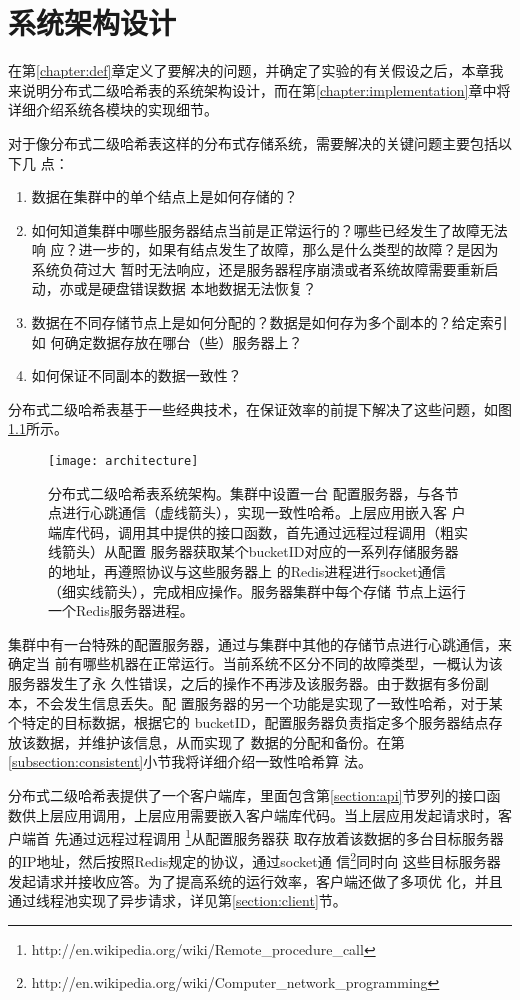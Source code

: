 \chapter{系统架构设计}\label{chapter:architecture}
在第\ref{chapter:def}章定义了要解决的问题，并确定了实验的有关假设之后，本章我
来说明分布式二级哈希表的系统架构设计，而在第\ref{chapter:implementation}章中将
详细介绍系统各模块的实现细节。

对于像分布式二级哈希表这样的分布式存储系统，需要解决的关键问题主要包括以下几
点：
\begin{enumerate}
  \item 数据在集群中的单个结点上是如何存储的？
  \item 如何知道集群中哪些服务器结点当前是正常运行的？哪些已经发生了故障无法响
  应？进一步的，如果有结点发生了故障，那么是什么类型的故障？是因为系统负荷过大
  暂时无法响应，还是服务器程序崩溃或者系统故障需要重新启动，亦或是硬盘错误数据
  本地数据无法恢复？
  \item 数据在不同存储节点上是如何分配的？数据是如何存为多个副本的？给定索引如
  何确定数据存放在哪台（些）服务器上？
  \item 如何保证不同副本的数据一致性？
\end{enumerate}
分布式二级哈希表基于一些经典技术，在保证效率的前提下解决了这些问题，如图
\ref{figure:architecture}所示。
\begin{figure}[htb]
  \centering
  \texttt{[image: architecture]}
  \caption[分布式二级哈希表系统架构]{分布式二级哈希表系统架构。集群中设置一台
  配置服务器，与各节点进行心跳通信（虚线箭头），实现一致性哈希。上层应用嵌入客
  户端库代码，调用其中提供的接口函数，首先通过远程过程调用（粗实线箭头）从配置
  服务器获取某个bucketID对应的一系列存储服务器的地址，再遵照协议与这些服务器上
  的Redis进程进行socket通信（细实线箭头），完成相应操作。服务器集群中每个存储
  节点上运行一个Redis服务器进程。}
  \label{figure:architecture}
\end{figure}

集群中有一台特殊的配置服务器，通过与集群中其他的存储节点进行心跳通信，来确定当
前有哪些机器在正常运行。当前系统不区分不同的故障类型，一概认为该服务器发生了永
久性错误，之后的操作不再涉及该服务器。由于数据有多份副本，不会发生信息丢失。配
置服务器的另一个功能是实现了一致性哈希，对于某个特定的目标数据，根据它的
bucketID，配置服务器负责指定多个服务器结点存放该数据，并维护该信息，从而实现了
数据的分配和备份。在第\ref{subsection:consistent}小节我将详细介绍一致性哈希算
法。

分布式二级哈希表提供了一个客户端库，里面包含第\ref{section:api}节罗列的接口函
数供上层应用调用，上层应用需要嵌入客户端库代码。当上层应用发起请求时，客户端首
先通过远程过程调用
\footnote{http://en.wikipedia.org/wiki/Remote\_procedure\_call}从配置服务器获
取存放着该数据的多台目标服务器的IP地址，然后按照Redis规定的协议，通过socket通
信\footnote{http://en.wikipedia.org/wiki/Computer\_network\_programming}同时向
这些目标服务器发起请求并接收应答。为了提高系统的运行效率，客户端还做了多项优
化，并且通过线程池实现了异步请求，详见第\ref{section:client}节。

